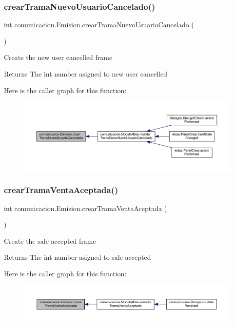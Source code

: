 \subsubsection{\texorpdfstring{crear\+Trama\+Nuevo\+Usuario\+Cancelado()}{crearTramaNuevoUsuarioCancelado()}}
{\footnotesize\ttfamily int comunicacion.\+Emision.\+crear\+Trama\+Nuevo\+Usuario\+Cancelado (\begin{DoxyParamCaption}{ }\end{DoxyParamCaption})}

Create the new user cancelled frame \begin{DoxyReturn}{Returns}
The int number asigned to new user cancelled 
\end{DoxyReturn}
Here is the caller graph for this function\+:
\nopagebreak
\begin{figure}[H]
\begin{center}
\leavevmode
\includegraphics[width=350pt]{classcomunicacion_1_1_emision_aa2b41a69ac8589e519c45e5f674ab135_icgraph}
\end{center}
\end{figure}
\mbox{\label{classcomunicacion_1_1_emision_ab2a5697489ffb7d87fc89057cc5f9798}} 
\subsubsection{\texorpdfstring{crear\+Trama\+Venta\+Aceptada()}{crearTramaVentaAceptada()}}
{\footnotesize\ttfamily int comunicacion.\+Emision.\+crear\+Trama\+Venta\+Aceptada (\begin{DoxyParamCaption}{ }\end{DoxyParamCaption})}

Create the sale accepted frame \begin{DoxyReturn}{Returns}
The int number asigned to sale accepted 
\end{DoxyReturn}
Here is the caller graph for this function\+:
\nopagebreak
\begin{figure}[H]
\begin{center}
\leavevmode
\includegraphics[width=350pt]{classcomunicacion_1_1_emision_ab2a5697489ffb7d87fc89057cc5f9798_icgraph}
\end{center}
\end{figure}


